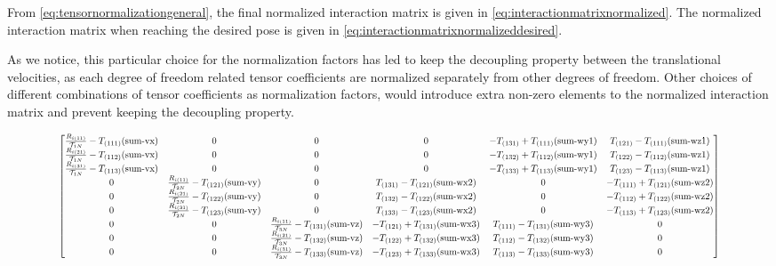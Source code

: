 From \eqref{eq:tensornormalizationgeneral}, the final normalized interaction matrix is given in \eqref{eq:interactionmatrixnormalized}. The normalized interaction matrix when reaching the desired pose is given in \eqref{eq:interactionmatrixnormalizeddesired}.

As we notice, this particular choice for the normalization factors has led to keep the decoupling property between the translational velocities, as each degree of freedom related tensor coefficients are normalized separately from other degrees of freedom. Other choices of different combinations of tensor coefficients as normalization factors, would introduce extra non-zero elements to the normalized interaction matrix and prevent keeping the decoupling property.

\clearpage
\begin{landscape}
\begin{equation}
\begin{gathered}
  \scalemath{0.75}{
  \begin{bmatrix}
    \frac{R_{i(11)}}{\mathcal{T}_{1N}} -T_{(111)}(\text{sum-vx}) & 0 & 0 & 0 & - T_{(131)} + T_{(111)}(\text{sum-wy1}) & T_{(121)}- T_{(111)}(\text{sum-wz1})\\
    \frac{R_{i(21)}}{\mathcal{T}_{1N}} -T_{(112)}(\text{sum-vx}) & 0 & 0 & 0 & - T_{(132)} + T_{(112)}(\text{sum-wy1}) & T_{(122)}- T_{(112)}(\text{sum-wz1})\\
    \frac{R_{i(31)}}{\mathcal{T}_{1N}} -T_{(113)}(\text{sum-vx}) & 0 & 0 & 0 & - T_{(133)} + T_{(113)}(\text{sum-wy1}) & T_{(123)}- T_{(113)}(\text{sum-wz1})\\

    0 & \frac{R_{i(11)}}{\mathcal{T}_{2N}} -T_{(121)}(\text{sum-vy}) & 0 & T_{(131)} - T_{(121)}(\text{sum-wx2})& 0 & - T_{(111)}+ T_{(121)}(\text{sum-wz2})\\
    0 & \frac{R_{i(21)}}{\mathcal{T}_{2N}} -T_{(122)}(\text{sum-vy}) & 0 & T_{(132)} - T_{(122)}(\text{sum-wx2})& 0 & - T_{(112)}+ T_{(122)}(\text{sum-wz2})\\
    0 & \frac{R_{i(31)}}{\mathcal{T}_{2N}} -T_{(123)}(\text{sum-vy}) & 0 & T_{(133)} - T_{(123)}(\text{sum-wx2})& 0 & - T_{(113)}+ T_{(123)}(\text{sum-wz2})\\

    0 & 0 & \frac{R_{i(11)}}{\mathcal{T}_{3N}} -T_{(131)}(\text{sum-vz}) & - T_{(121)} + T_{(131)}(\text{sum-wx3}) & T_{(111)} - T_{(131)}(\text{sum-wy3})& 0 \\
    0 & 0 & \frac{R_{i(21)}}{\mathcal{T}_{3N}} -T_{(132)}(\text{sum-vz}) & - T_{(122)} + T_{(132)}(\text{sum-wx3}) & T_{(112)} - T_{(132)}(\text{sum-wy3})& 0 \\
    0 & 0 & \frac{R_{i(31)}}{\mathcal{T}_{3N}} -T_{(133)}(\text{sum-vz}) & - T_{(123)} + T_{(133)}(\text{sum-wx3}) & T_{(113)} - T_{(133)}(\text{sum-wy3})& 0 \\



\end{bmatrix}}
\end{gathered}
\end{equation}
\end{landscape}

